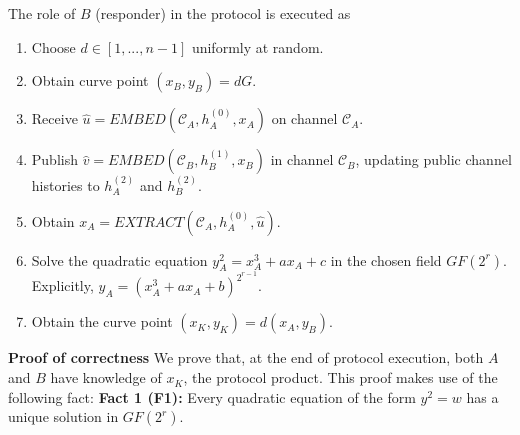 \documentclass{article}
\begin{document}
\noindent The role of $B$ (responder) in the protocol is executed as

\begin{enumerate}
\item{Choose $d \in [1,...,n-1]$ uniformly at random.}
\item{Obtain curve point $(x_B, y_B) = dG$.}
\item{Receive $\hat{u}=EMBED(\mathcal{C}_A, h_A^{(0)},x_A)$ on channel $\mathcal{C}_{A}$.}
\item{Publish $\hat{v}=EMBED(\mathcal{C}_B, h_B^{(1)},x_B)$ in channel $\mathcal{C}_{B}$, updating 
public channel histories to $h_{A}^{(2)}$ and $h_B^{(2)}$.}
\item{Obtain $x_A = EXTRACT(\mathcal{C}_A, h_A^{(0)}, \hat{u})$.}
\item{Solve the quadratic equation $y_A^2=x_A^3 + ax_A + c$ in the chosen field $GF(2^r)$.  
Explicitly, $y_A = (x_A^3 + ax_A + b)^{2^{r-1}}$.}
\item{Obtain the curve point $(x_K, y_K) =d(x_A,y_B)$.}
\end{enumerate}

\noindent \textbf{Proof of correctness }  We prove that, at the end of protocol execution, 
both $A$ and $B$ have knowledge of $x_K$, the protocol product.  This proof makes use of the following fact:
\newline\newline
\noindent \textbf{Fact 1 (F1): } Every quadratic equation of the form $y^2=w$ has a 
unique solution in $GF(2^r)$.  
\end{document}
